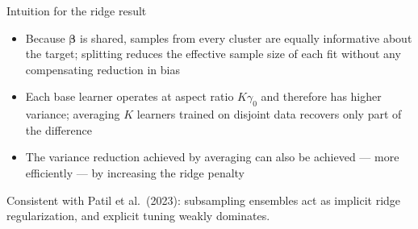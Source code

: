 \documentclass[aspectratio=169,11pt]{beamer}
\newcommand{\bbeta}{\bm{\beta}}
\begin{document}
\begin{frame}{Intuition for the ridge result}
  \begin{itemize}
    \item Because $\bbeta$ is shared, samples from every cluster are equally informative about the target; splitting reduces the effective sample size of each fit without any compensating reduction in bias
    \item Each base learner operates at aspect ratio $K\gamma_0$ and therefore has higher variance; averaging $K$ learners trained on disjoint data recovers only part of the difference
    \item The variance reduction achieved by averaging can also be achieved --- more efficiently --- by increasing the ridge penalty
  \end{itemize}
  \vspace{2mm}
  {\small\textcolor{softgray}{Consistent with Patil et al.\ (2023): subsampling ensembles act as implicit ridge regularization, and explicit tuning weakly dominates.}}
\end{frame}
\end{document}
